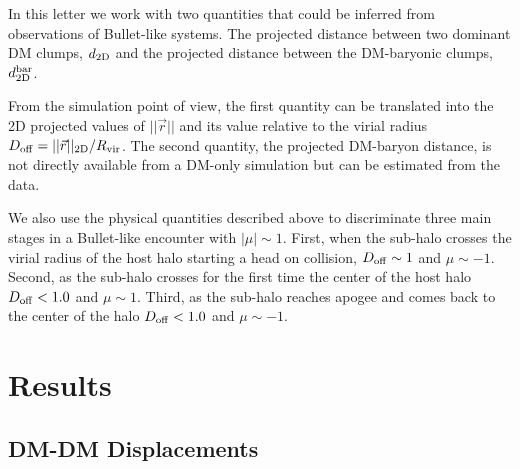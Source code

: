 \documentclass{emulateapj}
\begin{document}
In this letter we work with two quantities that could be inferred
from observations of Bullet-like systems. The projected distance
between two dominant DM clumps, $d_{\rm 2D}$ and the projected distance
between the DM-baryonic clumps, $d_{\rm 2D}^{\rm bar}$.

From the simulation point of view, the first quantity can be
translated into the 2D projected values of $||\vec{r}||$ and its value
relative to the virial radius $D_{\rm   off}= ||\vec{r}||_{\rm
  2D}/R_{\rm vir}$. The second quantity, the projected DM-baryon
distance, is not directly available from a DM-only simulation but can
be estimated from the data.  

We also use the physical quantities described above to discriminate
three main stages in a Bullet-like encounter with $|\mu|\sim
1$. First, when the sub-halo crosses the virial radius of the host
halo starting a head on collision, $D_{\rm   off} \sim 1$ and $\mu\sim
-1$. Second, as the sub-halo crosses for the first time the center of
the host halo $D_{\rm off}<1.0$ and $\mu\sim 1$. Third, as the
sub-halo reaches apogee and comes back to the center of the halo
$D_{\rm off} < 1.0$ and $\mu\sim -1$.   


\section{Results}
\label{sec:results}

\subsection{DM-DM Displacements}
\label{fig:displacement}
\end{document}
